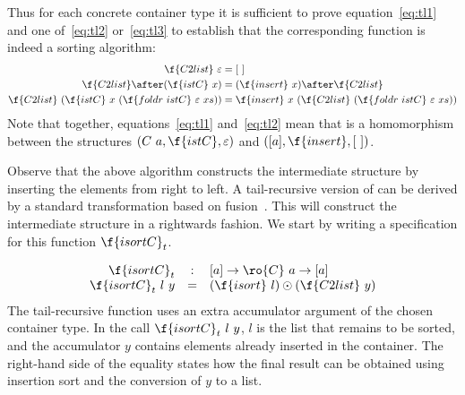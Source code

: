 \documentclass[a4paper,11pt]{llncs}
\begin{document}
Thus for each concrete container type it is sufficient to prove
equation~\ref{eq:tl1} and one of~\ref{eq:tl2} or~\ref{eq:tl3} to
establish that the corresponding function  is indeed a
sorting algorithm:
\begin{align}
\label{eq:tl1} \f{C2list}\ \varepsilon & = [\ ]\\
\label{eq:tl2} \f{C2list} \after (\f{istC}\ x) & = (\f{insert}\ x)
\after \f{C2list} \\
\label{eq:tl3} \f{C2list}\ (\f{istC}\ x\ (\f{foldr\ istC}\ \varepsilon\
xs)) & = \f{insert}\ x\ (\f{C2list}\ (\f{foldr\ istC}\ \varepsilon\ xs))
\end{align}
Note that together, equations~\ref{eq:tl1} and~\ref{eq:tl2} mean that
\tf{C2list} is a homomorphism between the structures $(C\ a, \f{istC},
\varepsilon)$ and $([a],\f{insert},[\ ])$.















Observe that the above algorithm constructs the intermediate structure
by inserting the elements from right to left.  
A tail-recursive version of  can be derived by a standard
transformation based on fusion~\cite{BirdR:proastp}. This will
construct the intermediate structure in a rightwards fashion.
We start by writing a specification for this function $\f{isortC}_t$.

$$
\begin{array}{rcl}
 \f{isortC}_t & : & [a] \to \ro{C}\ a \to [a]\\
 \f{isortC}_t\ l\ y & = & (\f{isort}\ l) \odot (\f{C2list}\ y)
\end{array}
$$
The tail-recursive function uses an extra accumulator argument of the
chosen container type. In the call $\f{isortC}_t\ l\ y$, $l$ is the
list that remains to be sorted, and the accumulator $y$ contains
elements already inserted in the container. The right-hand side of the
equality states how the final result can be obtained using insertion
sort and the conversion of $y$ to a list. 
\end{document}
